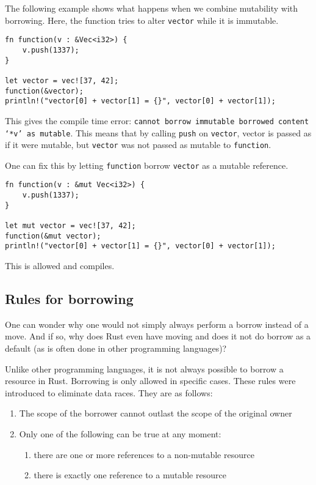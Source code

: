 The following example shows what happens when we combine mutability with borrowing. Here, the function tries to alter \verb|vector| while it is immutable. 

\begin{verbatim}
fn function(v : &Vec<i32>) {
    v.push(1337);
}

let vector = vec![37, 42];
function(&vector);
println!("vector[0] + vector[1] = {}", vector[0] + vector[1]);
\end{verbatim}

This gives the compile time error: \texttt{cannot borrow immutable borrowed content `*v' as mutable}. This means that by calling \verb|push| on \verb|vector|, vector is passed as if it were mutable, but \verb|vector| was not passed as mutable to \verb|function|. 

One can fix this by letting \verb|function| borrow \verb|vector| as a mutable reference. 

\begin{verbatim}
fn function(v : &mut Vec<i32>) {
    v.push(1337);
}

let mut vector = vec![37, 42];
function(&mut vector);
println!("vector[0] + vector[1] = {}", vector[0] + vector[1]);
\end{verbatim}

This is allowed and compiles. 

\subsection{Rules for borrowing}
One can wonder why one would not simply always perform a borrow instead of a move. And if so, why does Rust even have moving and does it not do borrow as a default (as is often done in other programming languages)? 

Unlike other programming languages, it is not always possible to borrow a resource in Rust. Borrowing is only allowed in specific cases. These rules were introduced to eliminate data races. They are as follows:
\begin{enumerate}[noitemsep]
    \item The scope of the borrower cannot outlast the scope of the original owner
\item Only one of the following can be true at any moment:
    \begin{enumerate}[noitemsep]
        \item there are one or more references to a non-mutable resource
        \item there is exactly one reference to a mutable resource
    \end{enumerate}
\end{enumerate}

